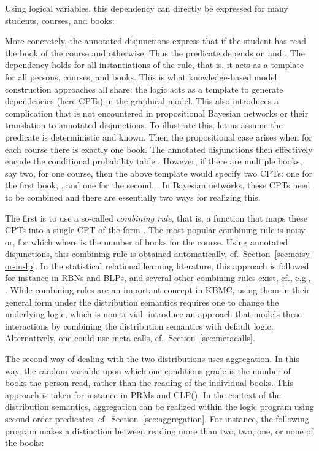 \documentclass[a4paper]{article}
\newcommand{\clpbn}
  {CLP()}
\begin{document}
Using logical variables, this dependency can directly be expressed for many
students, courses, and books: 


More concretely, the annotated disjunctions express that  
if  the student has read the book of the course 
and  otherwise.  Thus the predicate  depends on  and .  
The dependency holds for all instantiations of the rule, that is, it acts as a template for all persons, courses, and books.  
This is what knowledge-based model construction approaches all share: the logic acts as a template to generate
dependencies (here CPTs) in the graphical model. 
This also introduces a complication that is not encountered in propositional Bayesian networks
or their translation to annotated disjunctions. To illustrate this, let us 
assume the predicate  is deterministic and known. Then the propositional case 
arises when for each course there is exactly one book. The annotated disjunctions then effectively encode
the conditional probability table . However, if there are multiple books, say two,  
for one course, then the above template would specify two CPTs:
one for the first book, , and one for the second, . 
In Bayesian networks, these CPTs need to be combined and there are essentially two ways for realizing this. 

The first is to use a so-called \emph{combining rule}, that is, a function that maps these CPTs into a single 
CPT of the form . The most popular combining rule
is noisy-or, for which  where  is the number of books for the course.  
Using annotated disjunctions, this combining rule is obtained
automatically, cf.~Section~\ref{sec:noisy-or-in-lp}. 
In the statistical relational learning literature, this approach is
followed for instance in RBNs and BLPs, and several other combining
rules exist, cf., e.g.,
\citep{Jaeger97,Kersting08,natarajan:icml05}.
While combining rules are an important concept in KBMC, using them in
their general form under the distribution semantics requires one to change the underlying logic,
which is non-trivial. \cite{Hommersom11} introduce an approach that
models these interactions by combining the distribution semantics with
default logic. Alternatively, one could use meta-calls, cf.~Section~\ref{sec:metacalls}.


The second way of dealing with the two distributions uses aggregation. In this way, 
the random variable upon which one conditions grade is the number of books the person read,
rather than the reading of the individual books. This approach is 
taken for instance  in PRMs and \clpbn. In the context of the distribution
semantics, aggregation can be realized within the logic program using second order
predicates, cf.~Section~\ref{sec:aggregation}. For instance, the
following program makes a distinction between reading more than two,
two, one, or none of the books:
\end{document}
